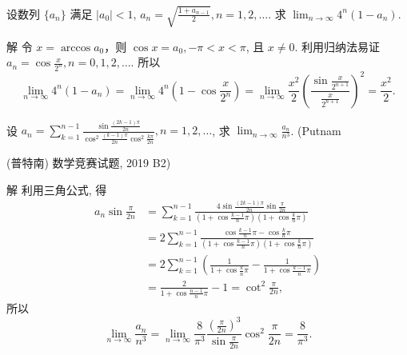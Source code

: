 \documentclass[lang=cn,newtx,10pt,scheme=chinese]{elegantbook}
\begin{document}
\begin{example}
  设数列 $\{a_n\}$ 满足 $|a_0| < 1$, $a_n = \sqrt{\frac{1 + a_{n-1}}{2}}, n=1, 2, \dots$. 求 $\lim_{n \to \infty} 4^n (1 - a_n)$.
\end{example}
\begin{solution}
  解 令 $x = \arccos a_0$，则 $\cos x = a_0, -\pi < x < \pi$, 且 $x \ne 0$. 利用归纳法易证 $a_n = \cos \frac{x}{2^n}, n = 0, 1, 2, \dots$.
  所以
  $$
  \lim_{n \to \infty} 4^n (1 - a_n) = \lim_{n \to \infty} 4^n \left(1 - \cos \frac{x}{2^n}\right) = \lim_{n \to \infty} \frac{x^2}{2} \left(\frac{\sin \frac{x}{2^{n+1}}}{\frac{x}{2^{n+1}}}\right)^2 = \frac{x^2}{2}.
  $$
\end{solution}

\begin{example}
  \begin{example}
  设 $a_n = \sum_{k=1}^{n-1} \frac{\sin \frac{(2k - 1)\pi}{2n}}{\cos^2 \frac{(k - 1)\pi}{2n} \cos^2 \frac{k\pi}{2n}}, n = 1, 2, \dots$, 求 $\lim_{n \to \infty} \frac{a_n}{n^3}$. (Putnam

  (普特南) 数学竞赛试题, 2019 B2)
\end{example}
\end{example}
\begin{solution}
  解 利用三角公式, 得
  $$
  \begin{aligned}
  a_n \sin \frac{\pi}{2n} &= \sum_{k=1}^{n-1} \frac{4 \sin \frac{(2k - 1)\pi}{2n} \sin \frac{\pi}{2n}}{\left(1 + \cos \frac{k-1}{n}\pi\right)\left(1 + \cos \frac{k}{n}\pi\right)} \\
  &= 2 \sum_{k=1}^{n-1} \frac{\cos \frac{k-1}{n}\pi - \cos \frac{k}{n}\pi}{\left(1 + \cos \frac{k-1}{n}\pi\right)\left(1 + \cos \frac{k}{n}\pi\right)} \\
  &= 2 \sum_{k=1}^{n-1} \left(\frac{1}{1 + \cos \frac{k}{n}\pi} - \frac{1}{1 + \cos \frac{k-1}{n}\pi}\right) \\
  &= \frac{2}{1 + \cos \frac{n-1}{n}\pi} - 1 = \cot^2 \frac{\pi}{2n},
  \end{aligned}
  $$
  所以
  $$
  \lim_{n \to \infty} \frac{a_n}{n^3} = \lim_{n \to \infty} \frac{8}{\pi^3} \frac{\left(\frac{\pi}{2n}\right)^3}{\sin \frac{\pi}{2n}} \cos^2 \frac{\pi}{2n} = \frac{8}{\pi^3}.
  $$
\end{solution}
\end{document}
